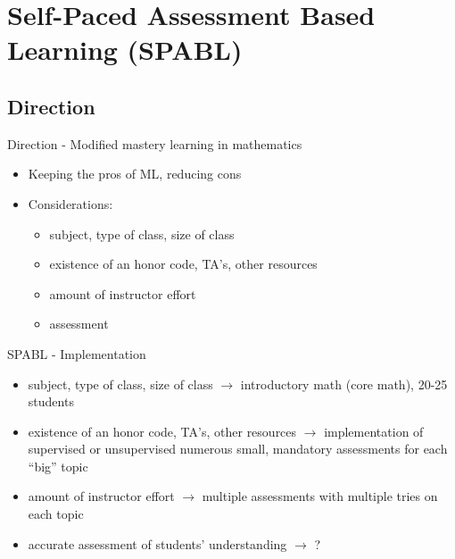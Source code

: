 \documentclass{beamer}
\begin{document}
\section{Self-Paced Assessment Based Learning (SPABL)}
\subsection{Direction}
\begin{frame}{Direction - Modified mastery learning in mathematics}
\begin{itemize}
  \item Keeping the pros of ML, reducing cons\pause
  \item Considerations:\pause
  \begin{itemize}
    \item subject, type of class, size of class
    \item existence of an honor code, TA's, other resources
    \item amount of instructor effort
    \item assessment
  \end{itemize}
\end{itemize}
\end{frame}
\begin{frame}{SPABL - Implementation}
  \begin{itemize}
    \item subject, type of class, size of class { {\color{red} $\to$ introductory math (core math), 20-25 students}}
    \item existence of an honor code, TA's, other resources { {\color{red} $\to$ implementation of supervised or unsupervised numerous small, mandatory assessments for each ``big'' topic}}
    \item amount of instructor effort { {\color{red} $\to$ multiple assessments with multiple tries on each topic}}
    \item accurate assessment of students' understanding { {\color{red} $\to$ ?}}
  \end{itemize}
\end{frame}
\end{document}
